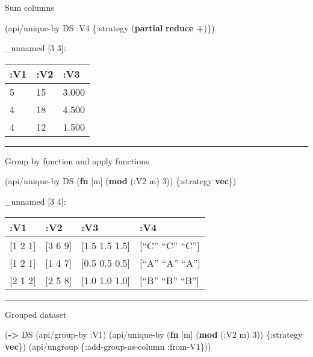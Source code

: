 \documentclass[]{article}
\newenvironment{Shaded}{\begin{snugshade}}{\end{snugshade}}
\newcommand{\KeywordTok}[1]{\textcolor[rgb]{0.13,0.29,0.53}{\textbf{#1}}}
\newcommand{\DecValTok}[1]{\textcolor[rgb]{0.00,0.00,0.81}{#1}}
\newcommand{\AttributeTok}[1]{\textcolor[rgb]{0.77,0.63,0.00}{#1}}
\newcommand{\NormalTok}[1]{#1}
\begin{document}
Sum columns

\begin{Shaded}
\begin{Highlighting}[]
\NormalTok{(api/unique-by DS }\AttributeTok{:V4}\NormalTok{ \{}\AttributeTok{:strategy}\NormalTok{ (}\KeywordTok{partial} \KeywordTok{reduce} \KeywordTok{+}\NormalTok{)\})}
\end{Highlighting}
\end{Shaded}

\_unnamed {[}3 3{]}:

\begin{longtable}[]{@{}lll@{}}
\toprule
:V1 & :V2 & :V3\tabularnewline
\midrule
\endhead
5 & 15 & 3.000\tabularnewline
4 & 18 & 4.500\tabularnewline
4 & 12 & 1.500\tabularnewline
\bottomrule
\end{longtable}

\begin{center}\rule{0.5\linewidth}{0.5pt}\end{center}

Group by function and apply functions

\begin{Shaded}
\begin{Highlighting}[]
\NormalTok{(api/unique-by DS (}\KeywordTok{fn}\NormalTok{ [m] (}\KeywordTok{mod}\NormalTok{ (}\AttributeTok{:V2}\NormalTok{ m) }\DecValTok{3}\NormalTok{)) \{}\AttributeTok{:strategy} \KeywordTok{vec}\NormalTok{\})}
\end{Highlighting}
\end{Shaded}

\_unnamed {[}3 4{]}:

\begin{longtable}[]{@{}llll@{}}
\toprule
:V1 & :V2 & :V3 & :V4\tabularnewline
\midrule
\endhead
{[}1 2 1{]} & {[}3 6 9{]} & {[}1.5 1.5 1.5{]} & {[}``C'' ``C''
``C''{]}\tabularnewline
{[}1 2 1{]} & {[}1 4 7{]} & {[}0.5 0.5 0.5{]} & {[}``A'' ``A''
``A''{]}\tabularnewline
{[}2 1 2{]} & {[}2 5 8{]} & {[}1.0 1.0 1.0{]} & {[}``B'' ``B''
``B''{]}\tabularnewline
\bottomrule
\end{longtable}

\begin{center}\rule{0.5\linewidth}{0.5pt}\end{center}

Grouped dataset

\begin{Shaded}
\begin{Highlighting}[]
\NormalTok{(}\KeywordTok{->}\NormalTok{ DS}
\NormalTok{    (api/group-by }\AttributeTok{:V1}\NormalTok{)}
\NormalTok{    (api/unique-by (}\KeywordTok{fn}\NormalTok{ [m] (}\KeywordTok{mod}\NormalTok{ (}\AttributeTok{:V2}\NormalTok{ m) }\DecValTok{3}\NormalTok{)) \{}\AttributeTok{:strategy} \KeywordTok{vec}\NormalTok{\})}
\NormalTok{    (api/ungroup \{}\AttributeTok{:add-group-as-column} \AttributeTok{:from-V1}\NormalTok{\}))}
\end{Highlighting}
\end{Shaded}
\end{document}
